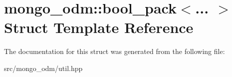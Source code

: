 \hypertarget{structmongo__odm_1_1bool__pack}{}\section{mongo\+\_\+odm\+:\+:bool\+\_\+pack$<$... $>$ Struct Template Reference}
\label{structmongo__odm_1_1bool__pack}


The documentation for this struct was generated from the following file\+:\begin{DoxyCompactItemize}
\item 
src/mongo\+\_\+odm/util.\+hpp\end{DoxyCompactItemize}
